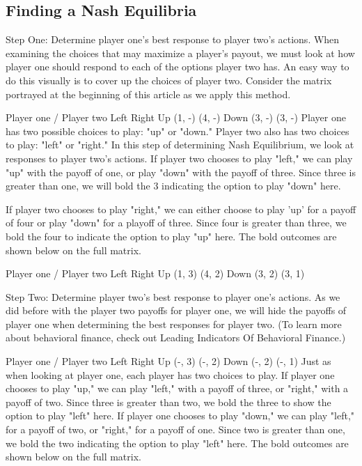 \subsection{Finding a Nash Equilibria}
Step One: Determine player one's best response to player two's actions.
When examining the choices that may maximize a player's payout, we must look at how player one should respond to each of the options player two has. An easy way to do this visually is to cover up the choices of player two. Consider the matrix portrayed at the beginning of this article as we apply this method.

Player one / Player two	Left	Right
Up	(1, -)	(4, -)
Down	(3, -)	(3, -)
Player one has two possible choices to play: "up" or "down." Player two also has two choices to play: "left" or "right." In this step of determining Nash Equilibrium, we look at responses to player two's actions. If player two chooses to play "left," we can play "up" with the payoff of one, or play "down" with the payoff of three. Since three is greater than one, we will bold the 3 indicating the option to play "down" here.

If player two chooses to play "right," we can either choose to play 'up' for a payoff of four or play "down" for a playoff of three. Since four is greater than three, we bold the four to indicate the option to play "up" here. The bold outcomes are shown below on the full matrix.

Player one / Player two	Left	Right
Up	(1, 3)	(4, 2)
Down	(3, 2)	(3, 1)

Step Two: Determine player two's best response to player one's actions.
As we did before with the player two payoffs for player one, we will hide the payoffs of player one when determining the best responses for player two. (To learn more about behavioral finance, check out Leading Indicators Of Behavioral Finance.)

Player one / Player two	Left	Right
Up	(-, 3)	(-, 2)
Down	(-, 2)	(-, 1)
Just as when looking at player one, each player has two choices to play. If player one chooses to play "up," we can play "left," with a payoff of three, or "right," with a payoff of two. Since three is greater than two, we bold the three to show the option to play "left" here. If player one chooses to play "down," we can play "left," for a payoff of two, or "right," for a payoff of one. Since two is greater than one, we bold the two indicating the option to play "left" here. The bold outcomes are shown below on the full matrix.

